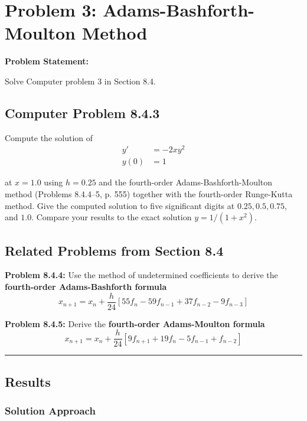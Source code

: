 \clearpage
\section*{Problem 3: Adams-Bashforth-Moulton Method}

\textbf{Problem Statement:} 

Solve Computer problem 3 in Section 8.4.

\subsection*{Computer Problem 8.4.3}

Compute the solution of
\begin{align*}
y' &= -2xy^2 \\
y(0) &= 1
\end{align*}

at $x = 1.0$ using $h = 0.25$ and the fourth-order Adams-Bashforth-Moulton method (Problems 8.4.4--5, p. 555) together with the fourth-order Runge-Kutta method. Give the computed solution to five significant digits at $0.25, 0.5, 0.75$, and $1.0$. Compare your results to the exact solution $y = 1/(1 + x^2)$.

\subsection*{Related Problems from Section 8.4}

\textbf{Problem 8.4.4:} Use the method of undetermined coefficients to derive the \textbf{fourth-order Adams-Bashforth formula}
$$x_{n+1} = x_n + \frac{h}{24}[55f_n - 59f_{n-1} + 37f_{n-2} - 9f_{n-3}]$$

\textbf{Problem 8.4.5:} Derive the \textbf{fourth-order Adams-Moulton formula}
$$x_{n+1} = x_n + \frac{h}{24}[9f_{n+1} + 19f_n - 5f_{n-1} + f_{n-2}]$$

\noindent\rule{\textwidth}{0.4pt}

\vspace{1em}

\clearpage
\subsection*{Results}

\subsubsection*{Solution Approach}

